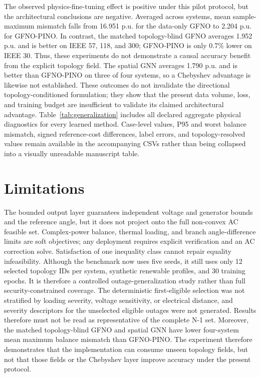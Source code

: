\documentclass[final,5p,times,twocolumn]{elsarticle}
\begin{document}
The observed physics-fine-tuning effect is positive under this pilot protocol,
but the architectural conclusions are negative. Averaged across systems, mean
sample-maximum mismatch falls from 16.951 p.u. for the data-only GFNO to
2.204 p.u. for GFNO-PINO. In contrast, the matched topology-blind GFNO averages
1.952 p.u. and is better on IEEE 57, 118, and 300; GFNO-PINO is only 0.7\%
lower on IEEE 30. Thus, these experiments
do not demonstrate a causal accuracy benefit from the explicit topology field.
The spatial GNN averages 1.790 p.u. and is better than GFNO-PINO on three of
four systems, so a Chebyshev advantage is likewise not established. These
outcomes do not invalidate the directional topology-conditioned formulation;
they show that the present data volume, loss, and training budget are
insufficient to validate its claimed architectural advantage.
Table~\ref{tab:generalization} includes all declared aggregate physical
diagnostics for every learned method. Case-level values, P95 and worst balance
mismatch, signed reference-cost differences, label errors, and
topology-resolved values remain
available in the accompanying CSVs rather than being collapsed into a visually
unreadable manuscript table.

\section{Limitations}
\label{sec:limitations}

The bounded output layer guarantees independent voltage and generator bounds
and the reference angle, but it does not project onto the full non-convex AC
feasible set. Complex-power balance, thermal loading, and branch
angle-difference limits are soft objectives; any deployment
requires explicit verification and an AC correction solve. Satisfaction of
one inequality class cannot repair equality infeasibility. Although the
benchmark now uses five seeds, it still uses only 12 selected topology IDs per
system, synthetic renewable profiles, and 30 training epochs. It is therefore
a controlled outage-generalization study rather than full security-constrained
coverage. The deterministic first-eligible selection was not stratified by
loading severity, voltage sensitivity, or electrical distance, and severity
descriptors for the unselected eligible outages were not generated. Results
therefore must not be read as representative of the complete N-1 set.
Moreover, the matched topology-blind GFNO and spatial GNN have lower
four-system mean maximum balance mismatch than GFNO-PINO. The experiment
therefore demonstrates that the implementation can consume unseen topology
fields, but not that those fields or the Chebyshev layer improve accuracy under
the present protocol.
\end{document}
